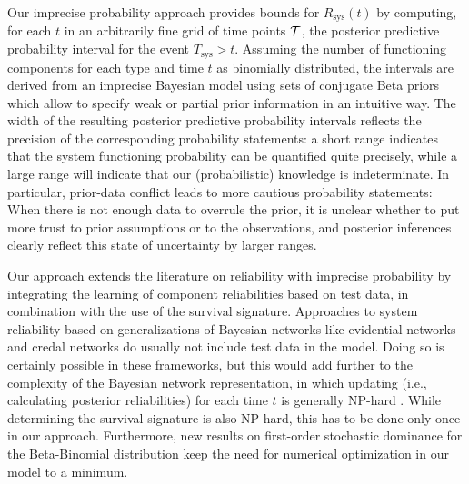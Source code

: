 \documentclass[12pt, a4paper]{elsarticle}
\newcommand{\Rsys}{R_\text{sys}}
\def\Tsys{T_\text{sys}}
\begin{document}
Our imprecise probability approach provides bounds for $\Rsys(t)$
by computing, for each $t$ in an arbitrarily fine grid of time points ${\cal T}$,
the posterior predictive probability interval for the event $\Tsys > t$. %
Assuming the number of functioning components for each type and time $t$ as binomially distributed, 
the intervals are derived from an imprecise Bayesian model using sets of conjugate Beta priors
which allow to specify weak or partial prior information in an intuitive way.
The width of the resulting posterior predictive probability intervals
reflects the precision of the corresponding probability statements:
a short range indicates that the system functioning probability can be quantified quite precisely,
while a large range will indicate that our (probabilistic) knowledge is indeterminate.
In particular, prior-data conflict leads to more cautious probability statements:
When there is not enough data to overrule the prior,
it is unclear whether to put more trust to prior assumptions or to the observations,
and posterior inferences clearly reflect this state of uncertainty by larger ranges.


Our approach extends the literature on reliability with imprecise probability
\citep[for an overview see][]{UC07}
by integrating the learning of component reliabilities based on test data,
in combination with the use of the survival signature.
Approaches to system reliability based on generalizations of Bayesian networks
like evidential networks \citep{2008:simon-weber-evsukoff}
and credal networks \cite{2011:antonucci::noisyor}
do usually not include test data in the model.
Doing so is certainly possible in these frameworks, 
but this would add further to the complexity of the Bayesian network representation,
in which updating (i.e., calculating posterior reliabilities) for each time $t$
is generally NP-hard \cite{2014:maua-decampos-benavoli-antonucci}.
While determining the survival signature is also NP-hard,
this has to be done only once in our approach.
Furthermore,
new results on first-order stochastic dominance for the Beta-Binomial distribution
keep the need for numerical optimization in our model to a minimum.
\end{document}
